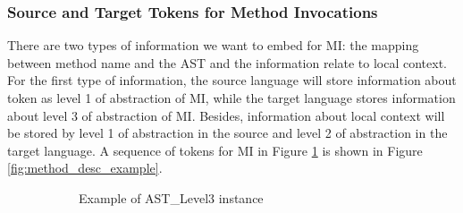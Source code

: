 \subsubsection{Source and Target Tokens for Method Invocations}
 There are two types of information we want to embed for MI: the mapping between method name and the AST and the information relate to local context. For the first type of information, the source language will store information about token as level 1 of abstraction of MI, while the target language stores information about level 3 of abstraction of MI. Besides, information about local context will be stored by level 1 of abstraction in the source and level 2 of abstraction in the target language. A sequence of tokens for MI in Figure \ref{fig:mapping_expression} is shown in Figure \ref{fig:method_desc_example}.
 \noindent
\begin{figure}
    \centering
      \begin{subfigure}{0.23\textwidth}
        \caption{Example of AST\_Level3 instance}
        \label{fig:mapping_expression} 
      \end{subfigure}
      \hfill
      \begin{subfigure}[t]{0.23\textwidth}
\end{subfigure}
\end{figure}
